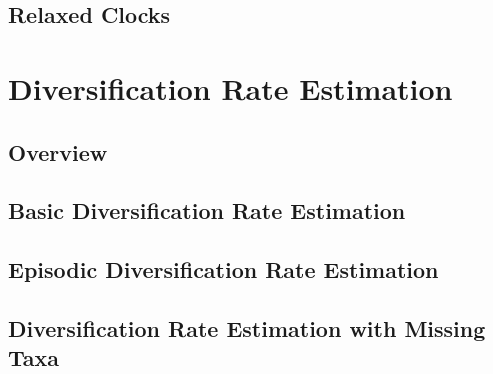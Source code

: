 \documentclass[11pt]{book}
\begin{document}
\chapter{Relaxed Clocks}
\def \ResourcePath {RB_DivergenceTime_RelaxedClock_Tutorial/}


%





\part{Diversification Rate Estimation}

\chapter{Overview}
\def \ResourcePath {RB_DiversificationRateIntro_Tutorial/}


\chapter{Basic Diversification Rate Estimation}
\def \ResourcePath {RB_DiversificationRate_Tutorial/}


\chapter{Episodic Diversification Rate Estimation}
\def \ResourcePath {RB_DiversificationRate_Episodic_Tutorial/}


\chapter{Diversification Rate Estimation with Missing Taxa}
\def \ResourcePath {RB_DiversificationRate_Sampling_Tutorial/}

\end{document}
